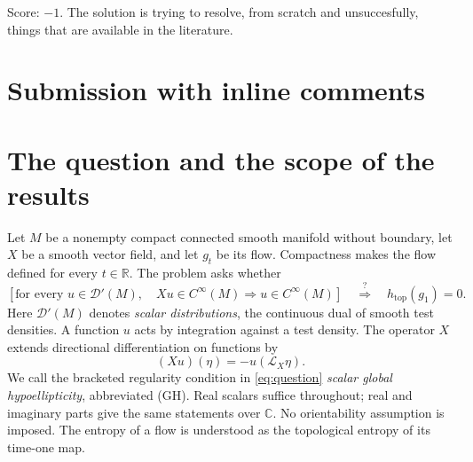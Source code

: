\documentclass[11pt]{article}
\theoremstyle{definition}
\theoremstyle{remark}
\newcommand{\R}{\mathbb R}
\newcommand{\D}{\mathcal D'}
\newcommand{\eps}{\varepsilon}
\newcommand{\htop}{h_{\mathrm{top}}}
\begin{document}
\noindent Score: $-1$.
The solution is trying to resolve, from scratch and unsuccesfully, things that are available in the literature.

\newpage
\section{Submission with inline comments}


\begin{abstract}
Let $X$ be a smooth vector field on a compact connected manifold without boundary, and suppose that every scalar distribution $u$ is smooth whenever $Xu$ is smooth. The question is whether the generated flow has zero topological entropy. We prove that the scalar kernel consists of constants, the smooth range of $X$ is closed, and the flow is nonwandering. We give two approximation criteria for a positive smooth invariant density. Fix a normalized Riemannian density $\rho$ and its Laplacian $\Delta$. For the stationary probability densities $a_\eps\rho$ of $X+\eps\Delta$, we prove $\eps\|\log a_\eps\|_\infty\to0$; boundedness of $-\int_M\log a_\eps\,\rho$ along a sequence $\eps\downarrow0$ is a stronger condition, equivalent here to existence of a positive smooth invariant density. We also prove a conditional entropy criterion and an exact suspension reduction. These results do not establish zero entropy in general: construction of an invariant density and the subsequent entropy implication remain unresolved by the arguments given here.
\end{abstract}

\section{The question and the scope of the results}

Let $M$ be a nonempty compact connected smooth manifold without boundary, let $X$ be a smooth vector field, and let $g_t$ be its flow. Compactness makes the flow defined for every $t\in\R$. The problem asks whether
\begin{equation}\label{eq:question}
 \left[\text{for every }u\in\D(M),\quad
 Xu\in C^\infty(M)\Longrightarrow u\in C^\infty(M)\right]
 \quad\stackrel{?}{\Longrightarrow}\quad \htop(g_1)=0.
\end{equation}
Here $\D(M)$ denotes \emph{scalar distributions}, the continuous dual of smooth test densities. A function $u$ acts by integration against a test density. The operator $X$ extends directional differentiation on functions by
\[
 (Xu)(\eta)=-u(\mathcal L_X\eta).
\]
We call the bracketed regularity condition in \eqref{eq:question} \emph{scalar global hypoellipticity}, abbreviated (GH). Real scalars suffice throughout; real and imaginary parts give the same statements over $\mathbb C$. No orientability assumption is imposed. The entropy of a flow is understood as the topological entropy of its time-one map.
\end{document}
